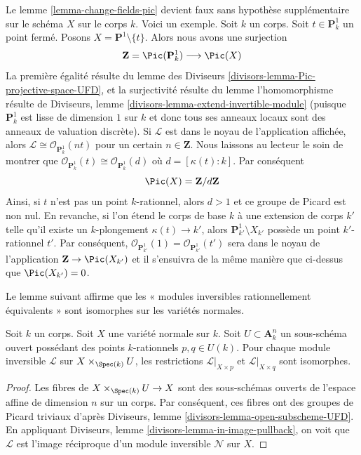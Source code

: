 \begin{example}
\label{example-need-condition}
 Le lemme \ref{lemma-change-fields-pic} devient faux sans hypothèse supplémentaire
sur le schéma $X$ sur le corps $k$. Voici un exemple. Soit
$k$ un corps. Soit $t \in \mathbf{P}^1_k$ un point fermé.
Posons $X = \mathbf{P}^1 \setminus \{t\}$. Alors nous avons une surjection 
$$
\mathbf{Z} = \Pic(\mathbf{P}^1_k) \longrightarrow \Pic(X)
$$
 La première égalité résulte du lemme
des Diviseurs \ref{divisors-lemma-Pic-projective-space-UFD},
 et la surjectivité résulte du lemme
l'homomorphisme résulte de Diviseurs, lemme \ref{divisors-lemma-extend-invertible-module}
 (puisque $\mathbf{P}^1_k$ est lisse de dimension $1$ sur $k$ et
donc tous ses anneaux locaux sont des anneaux de valuation discrète). Si 
$\mathcal{L}$ est dans le noyau de l'application affichée,
alors $\mathcal{L} \cong \mathcal{O}_{\mathbf{P}^1_k}(nt)$
 pour un certain $n \in \mathbf{Z}$. Nous laissons au lecteur le soin
de montrer que 
$\mathcal{O}_{\mathbf{P}^1_k}(t) \cong \mathcal{O}_{\mathbf{P}^1_k}(d)$
 où $d = [\kappa(t) : k]$. Par conséquent 
$$
\Pic(X) = \mathbf{Z}/d\mathbf{Z}
$$
 Ainsi, si $t$ n'est pas un point $k$-rationnel, alors $d > 1$ et ce
groupe de Picard est non
nul. En revanche, si l'on étend le corps de base $k$ à une extension
de corps $k'$ telle qu'il existe un $k$-plongement 
$\kappa(t) \to k'$, alors $\mathbf{P}^1_{k'} \setminus X_{k'}$
 possède un point $k'$-rationnel $t'$. Par conséquent, 
$\mathcal{O}_{\mathbf{P}^1_{k'}}(1) = \mathcal{O}_{\mathbf{P}^1_{k'}}(t')$
 sera dans le noyau de l'application $\mathbf{Z} \to \Pic(X_{k'})$
 et il s'ensuivra de la même manière que ci-dessus que 
$\Pic(X_{k'}) = 0$. 
\end{example}

\noindent
 Le lemme suivant affirme que les «
modules inversibles rationnellement équivalents » sont isomorphes sur les variétés normales.

\begin{lemma}
\label{lemma-rational-equivalence-for-Pic}
 Soit $k$ un corps. Soit $X$ une variété normale sur $k$.
Soit $U \subset \mathbf{A}^n_k$ un sous-schéma ouvert possédant des points 
$k$-rationnels $p, q \in U(k)$. Pour chaque module
inversible $\mathcal{L}$ sur $X \times_{\Spec(k)} U$, les restrictions 
$\mathcal{L}|_{X \times p}$ et $\mathcal{L}|_{X \times q}$
 sont isomorphes. 
\end{lemma}

\begin{proof}
 Les fibres de $X \times_{\Spec(k)} U \to X$ sont des sous-schémas ouverts de
l'espace affine de dimension $n$ sur un corps. Par conséquent, ces fibres ont
des groupes de Picard triviaux
d'après Diviseurs, lemme \ref{divisors-lemma-open-subscheme-UFD}.
En appliquant Diviseurs, lemme \ref{divisors-lemma-in-image-pullback},
on voit que $\mathcal{L}$ est l'image réciproque d'un module
inversible $\mathcal{N}$ sur $X$. 
\end{proof}











